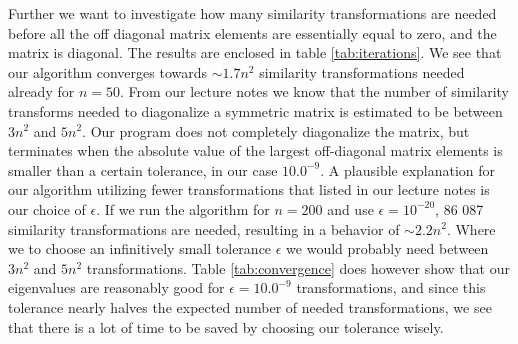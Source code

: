 \documentclass[12pt]{article}
\numberwithin{figure}{section}
\numberwithin{table}{section}
\begin{document}
\noindent Further we want to investigate how many similarity transformations are needed before all the off diagonal matrix elements are essentially equal to zero, and the matrix is diagonal. The results are enclosed in table \ref{tab:iterations}. We see that our algorithm converges towards $\sim 1.7 n^2$ similarity transformations needed already for $n = 50$. From our lecture notes \cite{Comp} we know that the number of similarity transforms needed to diagonalize a symmetric matrix is estimated to be between $3 n^2$ and $5 n^2$. Our program does not completely diagonalize the matrix, but terminates when the absolute value of the largest off-diagonal matrix elements is smaller than a certain tolerance, in our case $10.0^{-9}$. A plausible explanation for our algorithm utilizing fewer transformations that listed in our lecture notes \cite{Comp} is our choice of $\epsilon$. If we run the algorithm for $n = 200$ and use $\epsilon = 10^{-20}$, 86 087 similarity transformations are needed, resulting in a behavior of $\sim 2.2 n^2$. Where we to choose an infinitively small tolerance $\epsilon$ we would probably need between $3n^2$ and $5n^2$ transformations. Table \ref{tab:convergence} does however show that our eigenvalues are reasonably good for $\epsilon=10.0^{-9}$ transformations, and since this tolerance nearly halves the expected number of needed transformations, we see that there is a lot of time to be saved by choosing our tolerance wisely. \\
\end{document}
